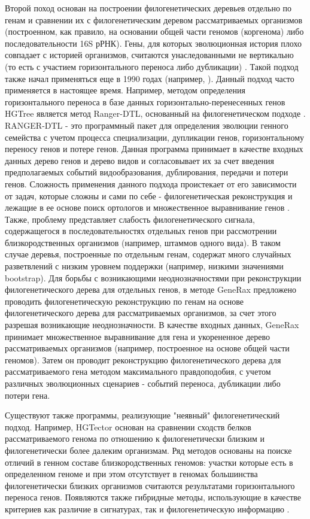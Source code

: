 Второй поход основан на построении филогенетических деревьев отдельно по генам и сравнении их с филогенетическим деревом рассматриваемых организмов (построенном, как правило, на основании общей части геномов (коргенома) либо последовательности 16S рРНК). Гены, для которых эволюционная история плохо совпадает с историей организмов, считаются унаследованными не вертикально (то есть с участием горизонтального переноса либо дубликации) \cite{tofigh2010simultaneous}. Такой подход также начал применяться еще в 1990 годах (например, \cite{smith1992evolution}). Данный подход часто применяется в настоящее время. Например, методом определения горизонтального переноса в базе данных горизонтально-перенесенных генов HGTree \cite{jeong2016hgtree} является метод Ranger-DTL, основанный на филогенетическом подходе \cite{bansal2012efficient}. RANGER-DTL  - это программный пакет для определения эволюции генного семейства с учетом процесса  специализации, дупликации генов, горизонтальному переносу генов и потере генов. Данная программа принимает в качестве входных данных дерево генов и дерево видов и согласовывает их за счет введения предполагаемых событий видообразования, дублирования, передачи и потери генов. Сложность применения данного подхода проистекает от его зависимости от задач, которые сложны и сами по себе - филогенетическая реконструкция и лежащие в ее основе поиск ортологов и множественное выравнивание генов \cite{sevillya2020detecting}. Также, проблему представляет слабость филогенетического сигнала, содержащегося в последовательностях отдельных генов при рассмотрении близкородственных организмов (например, штаммов одного вида). В таком случае деревья, построенные по отдельным генам, содержат много случайных разветвлений с низким уровнем поддержки (например, низкими значениями bootstrap). Для борьбы с возникающими неоднозначностями при реконструкции филогенетического дерева для отдельных генов, в методе GeneRax \cite{morel2020generax} предложено проводить филогенетическую реконструкцию по генам на основе филогенетического дерева для рассматриваемых организмов, за счет этого разрешая возникающие неоднозначности. В качестве входных данных, GeneRax принимает множественное выравнивание для гена и укорененное дерево рассматриваемых организмов (например, построенное на основе общей части геномов). Затем он проводит реконструкцию филогенетического дерева для рассматриваемого гена методом максимального правдоподобия, с учетом различных эволюционных сценариев - событий переноса, дубликации либо потери гена. 

Существуют также программы, реализующие "неявный" филогенетический подход. Например, HGTector основан на сравнении сходств белков рассматриваемого генома по отношению к филогенетически близким и филогенетически более далеким организмам. Ряд методов основаны на поиске отличий в генном составе близкородственных геномов: участки которые есть в определенном геноме и при этом отсутствует в геномах большинства филогенетически близких организмов считаются результатами горизонтального переноса генов. Появляются также гибридные методы, использующие в качестве критериев как различие в сигнатурах, так и филогенетическую информацию \cite{sanchez2020shadowcaster}.


